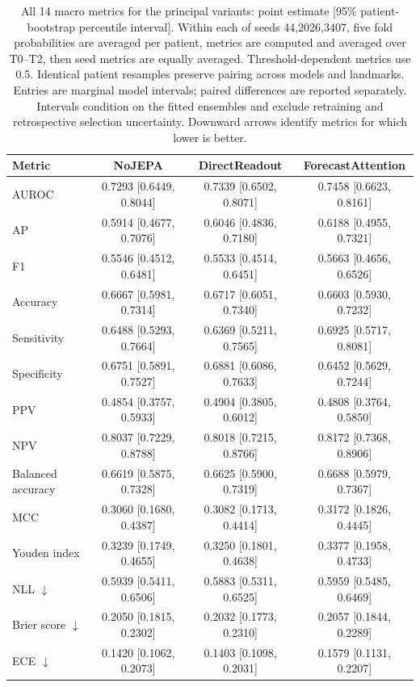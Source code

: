 \begin{table}[t]
\centering
\footnotesize
\setlength{\tabcolsep}{5pt}
\caption{All 14 macro metrics for the principal variants: point estimate [95\% patient-bootstrap percentile interval]. Within each of seeds 44,2026,3407, five fold probabilities are averaged per patient, metrics are computed and averaged over T0--T2, then seed metrics are equally averaged. Threshold-dependent metrics use 0.5. Identical patient resamples preserve pairing across models and landmarks. Entries are marginal model intervals; paired differences are reported separately. Intervals condition on the fitted ensembles and exclude retraining and retrospective selection uncertainty. Downward arrows identify metrics for which lower is better.}
\label{tab:extended_macro}
\begin{tabular}{lccc}
\toprule
Metric & NoJEPA & DirectReadout & ForecastAttention \\
\midrule
AUROC & 0.7293 [0.6449, 0.8044] & 0.7339 [0.6502, 0.8071] & 0.7458 [0.6623, 0.8161] \\
AP & 0.5914 [0.4677, 0.7076] & 0.6046 [0.4836, 0.7180] & 0.6188 [0.4955, 0.7321] \\
F1 & 0.5546 [0.4512, 0.6481] & 0.5533 [0.4514, 0.6451] & 0.5663 [0.4656, 0.6526] \\
Accuracy & 0.6667 [0.5981, 0.7314] & 0.6717 [0.6051, 0.7340] & 0.6603 [0.5930, 0.7232] \\
Sensitivity & 0.6488 [0.5293, 0.7664] & 0.6369 [0.5211, 0.7565] & 0.6925 [0.5717, 0.8081] \\
Specificity & 0.6751 [0.5891, 0.7527] & 0.6881 [0.6086, 0.7633] & 0.6452 [0.5629, 0.7244] \\
PPV & 0.4854 [0.3757, 0.5933] & 0.4904 [0.3805, 0.6012] & 0.4808 [0.3764, 0.5850] \\
NPV & 0.8037 [0.7229, 0.8788] & 0.8018 [0.7215, 0.8766] & 0.8172 [0.7368, 0.8906] \\
Balanced accuracy & 0.6619 [0.5875, 0.7328] & 0.6625 [0.5900, 0.7319] & 0.6688 [0.5979, 0.7367] \\
MCC & 0.3060 [0.1680, 0.4387] & 0.3082 [0.1713, 0.4414] & 0.3172 [0.1826, 0.4445] \\
Youden index & 0.3239 [0.1749, 0.4655] & 0.3250 [0.1801, 0.4638] & 0.3377 [0.1958, 0.4733] \\
NLL $\downarrow$ & 0.5939 [0.5411, 0.6506] & 0.5883 [0.5311, 0.6525] & 0.5959 [0.5485, 0.6469] \\
Brier score $\downarrow$ & 0.2050 [0.1815, 0.2302] & 0.2032 [0.1773, 0.2310] & 0.2057 [0.1844, 0.2289] \\
ECE $\downarrow$ & 0.1420 [0.1062, 0.2073] & 0.1403 [0.1098, 0.2031] & 0.1579 [0.1131, 0.2207] \\
\bottomrule
\end{tabular}
\end{table}
